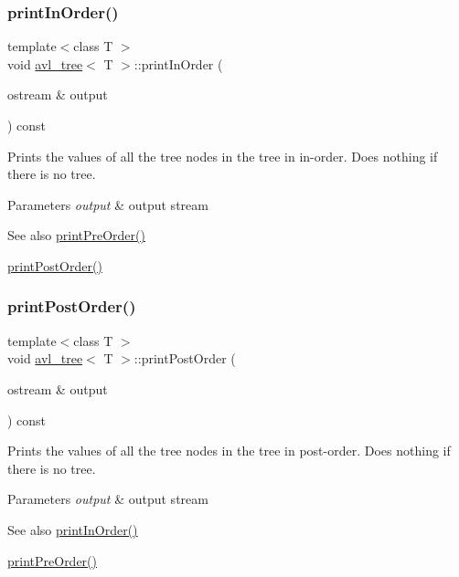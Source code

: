 \subsubsection{\texorpdfstring{print\+In\+Order()}{printInOrder()}}
{\footnotesize\ttfamily template$<$class T $>$ \\
void \hyperlink{classavl__tree}{avl\+\_\+tree}$<$ T $>$\+::print\+In\+Order (\begin{DoxyParamCaption}\item[{ostream \&}]{output }\end{DoxyParamCaption}) const\hspace{0.3cm}{\ttfamily [inline]}}

Prints the values of all the tree nodes in the tree in in-\/order. Does nothing if there is no tree. 
\begin{DoxyParams}{Parameters}
{\em output} & output stream \\
\hline
\end{DoxyParams}
\begin{DoxySeeAlso}{See also}
\hyperlink{classavl__tree_a789673966eca817f4efbf6bf17644c80}{print\+Pre\+Order()} 

\hyperlink{classavl__tree_a982fc15291d6a645964a9e7743383004}{print\+Post\+Order()} 
\end{DoxySeeAlso}
\mbox{\label{classavl__tree_a982fc15291d6a645964a9e7743383004}} 
\subsubsection{\texorpdfstring{print\+Post\+Order()}{printPostOrder()}}
{\footnotesize\ttfamily template$<$class T $>$ \\
void \hyperlink{classavl__tree}{avl\+\_\+tree}$<$ T $>$\+::print\+Post\+Order (\begin{DoxyParamCaption}\item[{ostream \&}]{output }\end{DoxyParamCaption}) const\hspace{0.3cm}{\ttfamily [inline]}}

Prints the values of all the tree nodes in the tree in post-\/order. Does nothing if there is no tree. 
\begin{DoxyParams}{Parameters}
{\em output} & output stream \\
\hline
\end{DoxyParams}
\begin{DoxySeeAlso}{See also}
\hyperlink{classavl__tree_ac7f553c3883b66f7758a71697bae5118}{print\+In\+Order()} 

\hyperlink{classavl__tree_a789673966eca817f4efbf6bf17644c80}{print\+Pre\+Order()} 
\end{DoxySeeAlso}
\mbox{\label{classavl__tree_a789673966eca817f4efbf6bf17644c80}} 
